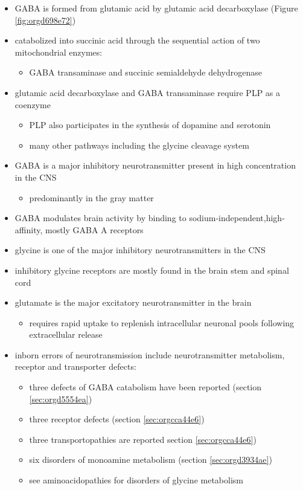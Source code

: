 \documentclass{scrartcl}
\begin{document}
\begin{itemize}
\item GABA is formed from glutamic acid by glutamic acid decarboxylase
(Figure \ref{fig:orgd698e72})
\item catabolized into succinic acid through the sequential action of two
mitochondrial enzymes:
\begin{itemize}
\item GABA transaminase and succinic semialdehyde dehydrogenase
\end{itemize}
\item glutamic acid decarboxylase and GABA transaminase require PLP as a coenzyme
\begin{itemize}
\item PLP also participates in the synthesis of dopamine and serotonin
\item many other pathways including the glycine cleavage system
\end{itemize}
\item GABA is a major inhibitory neurotransmitter present in high
concentration in the CNS
\begin{itemize}
\item predominantly in the gray matter
\end{itemize}
\item GABA modulates brain activity by binding to
sodium-independent,high-affinity, mostly GABA A receptors
\item glycine is one of the major inhibitory neurotransmitters in the CNS
\item inhibitory glycine receptors are mostly found in the brain stem
and spinal cord
\item glutamate is the major excitatory neurotransmitter in the brain
\begin{itemize}
\item requires rapid uptake to replenish intracellular
neuronal pools following extracellular release
\end{itemize}
\item inborn errors of neurotransmission include neurotransmitter
metabolism, receptor and transporter defects:
\begin{itemize}
\item three defects of GABA catabolism have been reported (section \ref{sec:orgd5554ea})
\item three receptor defects (section \ref{sec:orgcca44e6})
\item three transportopathies are reported section \ref{sec:orgcca44e6})
\item six disorders of monoamine metabolism (section \ref{sec:orgd3934ae})
\item see aminoacidopathies for disorders of glycine metabolism
\end{itemize}
\end{itemize}
\end{document}
